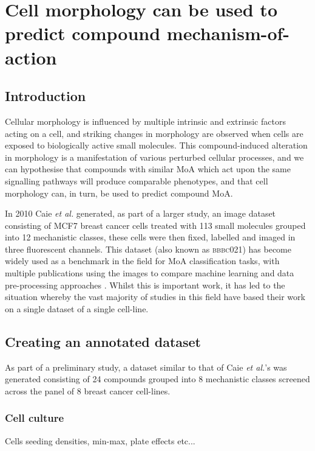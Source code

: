 \documentclass[a4paper,11pt,twoside,openright]{scrbook}
\begin{document}
\chapter{Cell morphology can be used to predict compound mechanism-of-action} \label{chapter:moa}
\section{Introduction}
Cellular morphology is influenced by multiple intrinsic and extrinsic factors acting on a cell, and striking changes in morphology are observed when cells are exposed to biologically active small molecules.
This compound-induced alteration in morphology is a manifestation of various perturbed cellular processes, and we can hypothesise that compounds with similar MoA which act upon the same signalling pathways will produce comparable phenotypes, and that cell morphology can, in turn, be used to predict compound MoA.

In 2010 Caie \textit{et al.} generated, as part of a larger study, an image dataset consisting of MCF7 breast cancer cells treated with 113 small molecules grouped into 12 mechanistic classes, these cells were then fixed, labelled and imaged in three fluorescent channels\cite{Caie2010}.
This dataset (also known as \textsc{bbbc021}) has become widely used as a benchmark in the field for MoA classification tasks, with multiple publications using the images to compare machine learning and data pre-processing approaches \cite{Ljosa2013a,Singh2014a,Pawlowski2016,Ando2017}.
Whilst this is important work, it has led to the situation whereby the vast majority of studies in this field have based their work on a single dataset of a single cell-line.



\section{Creating an annotated dataset}
%
As part of a preliminary study, a dataset similar to that of Caie \textit{et al.}'s was generated consisting of 24 compounds grouped into 8 mechanistic classes screened across the panel of 8 breast cancer cell-lines. %


\subsection{Cell culture}
Cells seeding densities, min-max, plate effects etc...
\end{document}

